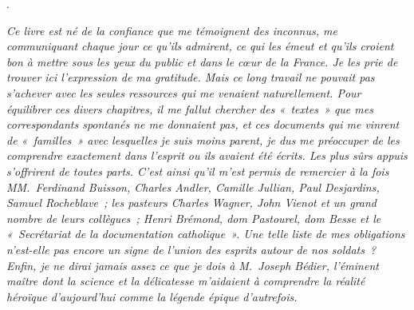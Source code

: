 \documentclass[french,twoside]{book} %
\newif\ifdev
\renewcommand{\LettrineFontHook}{\color{rubric}}
\newcommand{\initialiv}[2]{%
  \let\oldLFH\LettrineFontHook
  \IfSubStr{QJ’}{#1}{
    \lettrine[lines=4, lhang=0.2, loversize=-0.1, lraise=0.2]{\smash{#1}}{#2}
  }{\IfSubStr{É}{#1}{
    \lettrine[lines=4, lhang=0.2, loversize=-0, lraise=0]{\smash{#1}}{#2}
  }{\IfSubStr{ÀÂ}{#1}{
    \lettrine[lines=4, lhang=0.2, loversize=-0, lraise=0, slope=0.6em]{\smash{#1}}{#2}
  }{\IfSubStr{A}{#1}{
    \lettrine[lines=4, lhang=0.2, loversize=0.2, slope=0.6em]{\smash{#1}}{#2}
  }{\IfSubStr{V}{#1}{
    \lettrine[lines=4, lhang=0.2, loversize=0.2, slope=-0.5em]{\smash{#1}}{#2}
  }{
    \lettrine[lines=4, lhang=0.2, loversize=0.2]{\smash{#1}}{#2}
  }}}}}
  \let\LettrineFontHook\oldLFH
}
\newcommand{\dateline}[1]{\medskip{\RaggedLeft{#1}\par}\bigskip}
\newcommand\chapterclose{} %
\renewcommand{\LettrineFontHook}{\bfseries\color{rubric}}
\begin{document}
{{} }.‌\par
\par

\dateline{27 novembre 1916/9 mars 1917.‌}
\noindent \par
{\itshape Ce livre est né de la confiance que me témoignent des inconnus, me communiquant chaque jour ce qu’ils admirent, ce qui les émeut et qu’ils croient bon à mettre sous les yeux du public et dans le cœur de la France. Je les prie de trouver ici l’expression de ma gratitude. Mais ce long travail ne pouvait pas s’achever avec les seules ressources qui me venaient naturellement. Pour équilibrer ces divers chapitres, il me fallut chercher des « textes » que mes correspondants spontanés ne me donnaient pas, et ces documents qui me vinrent de « familles » avec lesquelles je suis moins parent, je dus me préoccuper de les comprendre exactement dans l’esprit ou ils avaient été écrits. Les plus sûrs appuis s’offrirent de toutes parts. C’est ainsi qu’il m’est permis de remercier à la fois MM. Ferdinand Buisson, Charles Andler, Camille Jullian, Paul Desjardins, Samuel Rocheblave ; les pasteurs Charles Wagner, John Vienot et un grand nombre de leurs collègues ; Henri Brémond, dom Pastourel, dom Besse et le « Secrétariat de la documentation catholique ». Une telle liste de mes obligations n’est-elle pas encore un signe de l’union des esprits autour de nos soldats ? Enfin, je ne dirai jamais assez ce que je dois à M. Joseph Bédier, l’éminent maître dont la science et la délicatesse m’aidaient à comprendre la réalité héroïque d’aujourd’hui comme la légende épique d’autrefois.‌}
\chapterclose

 


\ifbooklet
  \newpage\null\thispagestyle{empty}\newpage
\fi

\ifdev %
\fontname\font — \textsc{Les règles du jeu}\par
(\hyperref[utopie]{\underline{Lien}})\par
\noindent \initialiv{A}{lors là}\blindtext\par
\noindent \initialiv{À}{ la bonheur des dames}\blindtext\par
\noindent \initialiv{É}{tonnez-le}\blindtext\par
\noindent \initialiv{Q}{ualitativement}\blindtext\par
\noindent \initialiv{V}{aloriser}\blindtext\par
\Blindtext
\phantomsection
\label{utopie}
\Blinddocument
\fi
\end{document}
